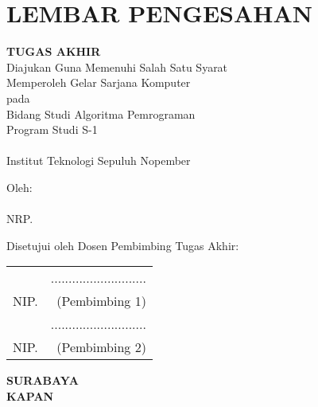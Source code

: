 \chapter{LEMBAR PENGESAHAN}
\small

\begin{center}
	\textbf{\MakeUppercase\judul}
	\vspace*{0.3em}
	
	\textbf{TUGAS AKHIR} \\
	Diajukan Guna Memenuhi Salah Satu Syarat\\
	Memperoleh Gelar Sarjana Komputer\\
	pada\\
	Bidang Studi Algoritma Pemrograman\\
	Program Studi S-1 \jurusan\\
	\fakultas \\
	Institut Teknologi Sepuluh Nopember
	
	\vspace*{0.3em}
	
	Oleh:\\
	\textbf{\penulis} \\
	NRP. \nrp
	
	\vspace*{1.1em}
\end{center}

Disetujui oleh Dosen Pembimbing Tugas Akhir: \\
\vspace*{1.3em}

\begin{tabularx}{\linewidth}{ @{}l r }
	\pembimbingsatu & ........................... \vspace*{1.4em} \\
	NIP. \nikpembimbingsatu & (Pembimbing 1) \vspace*{2.6em} \\
	
	\pembimbingdua & ........................... \vspace*{1.4em} \\
	NIP. \nikpembimbingdua & (Pembimbing 2) \vspace*{0.9em}
\end{tabularx}

\begin{center}
	\textbf {SURABAYA} \\
	\textbf {KAPAN}
\end{center}

\normalsize
\cleardoublepage